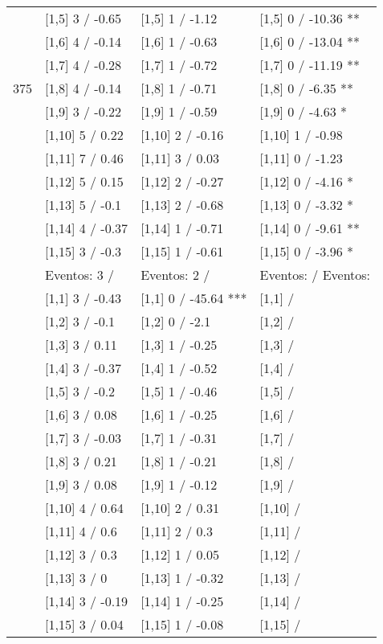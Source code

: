 \begin{table}
\begin{tabular}[t]{llll}
 & {}[1,5] 3  / -0.65 & {}[1,5] 1  / -1.12 & {}[1,5] 0  / -10.36 **\\
 & {}[1,6] 4  / -0.14 & {}[1,6] 1  / -0.63 & {}[1,6] 0  / -13.04 **\\
 & {}[1,7] 4  / -0.28 & {}[1,7] 1  / -0.72 & {}[1,7] 0  / -11.19 **\\
375 & {}[1,8] 4  / -0.14 & {}[1,8] 1  / -0.71 & {}[1,8] 0  / -6.35 **\\
\addlinespace
 & {}[1,9] 3  / -0.22 & {}[1,9] 1  / -0.59 & {}[1,9] 0  / -4.63 *\\
 & {}[1,10] 5  / 0.22 & {}[1,10] 2  / -0.16 & {}[1,10] 1  / -0.98\\
 & {}[1,11] 7  / 0.46 & {}[1,11] 3  / 0.03 & {}[1,11] 0  / -1.23\\
 & {}[1,12] 5  / 0.15 & {}[1,12] 2  / -0.27 & {}[1,12] 0  / -4.16 *\\
 & {}[1,13] 5  / -0.1 & {}[1,13] 2  / -0.68 & {}[1,13] 0  / -3.32 *\\
\addlinespace
 & {}[1,14] 4  / -0.37 & {}[1,14] 1  / -0.71 & {}[1,14] 0  / -9.61 **\\
 & {}[1,15] 3  / -0.3 & {}[1,15] 1  / -0.61 & {}[1,15] 0  / -3.96 *\\
 & Eventos:  3 / & Eventos:  2 / & Eventos:   / Eventos:\\
 & {}[1,1] 3  / -0.43 & {}[1,1] 0  / -45.64 *** & {}[1,1]  /\\
 & {}[1,2] 3  / -0.1 & {}[1,2] 0  / -2.1 & {}[1,2]  /\\
\addlinespace
 & {}[1,3] 3  / 0.11 & {}[1,3] 1  / -0.25 & {}[1,3]  /\\
 & {}[1,4] 3  / -0.37 & {}[1,4] 1  / -0.52 & {}[1,4]  /\\
 & {}[1,5] 3  / -0.2 & {}[1,5] 1  / -0.46 & {}[1,5]  /\\
 & {}[1,6] 3  / 0.08 & {}[1,6] 1  / -0.25 & {}[1,6]  /\\
 & {}[1,7] 3  / -0.03 & {}[1,7] 1  / -0.31 & {}[1,7]  /\\
\addlinespace
500 & {}[1,8] 3  / 0.21 & {}[1,8] 1  / -0.21 & {}[1,8]  /\\
 & {}[1,9] 3  / 0.08 & {}[1,9] 1  / -0.12 & {}[1,9]  /\\
 & {}[1,10] 4  / 0.64 & {}[1,10] 2  / 0.31 & {}[1,10]  /\\
 & {}[1,11] 4  / 0.6 & {}[1,11] 2  / 0.3 & {}[1,11]  /\\
 & {}[1,12] 3  / 0.3 & {}[1,12] 1  / 0.05 & {}[1,12]  /\\
\addlinespace
 & {}[1,13] 3  / 0 & {}[1,13] 1  / -0.32 & {}[1,13]  /\\
 & {}[1,14] 3  / -0.19 & {}[1,14] 1  / -0.25 & {}[1,14]  /\\
 & {}[1,15] 3  / 0.04 & {}[1,15] 1  / -0.08 & {}[1,15]  /\\
\bottomrule
\end{tabular}
\end{table}
